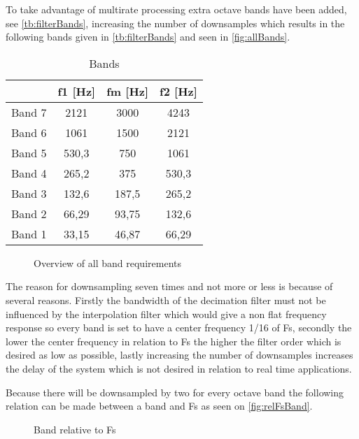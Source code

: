 To take advantage of multirate processing extra octave bands have been added, see \autoref{tb:filterBands}, increasing the number of downsamples which results in the following bands given in \autoref{tb:filterBands} and seen in \autoref{fig:allBands}.
\begin{table}[H]
\centering
\begin{tabular}{|c|c|c|c|}
\hline
       & f1 {[}Hz{]} & fm {[}Hz{]} & f2 {[}Hz{]} \\ \hline
Band 7 & 2121        & 3000        & 4243        \\ \hline
Band 6 & 1061        & 1500        & 2121        \\ \hline
Band 5 & 530,3       & 750         & 1061        \\ \hline
Band 4 & 265,2       & 375         & 530,3       \\ \hline
Band 3 & 132,6       & 187,5       & 265,2       \\ \hline
Band 2 & 66,29       & 93,75       & 132,6       \\ \hline
Band 1 & 33,15       & 46,87       & 66,29       \\ \hline
\end{tabular}
\caption{Bands}
\label{tb:filterBands}
\end{table}   

\begin{figure}[H]
	\centering
	
	\caption{Overview of all band requirements}
	\label{fig:allBands}
\end{figure}
The reason for downsampling seven times and not more or less is because of several reasons. Firstly the bandwidth of the decimation filter must not be influenced by the interpolation filter which would give a non flat frequency response so every band is set to have a center frequency 1/16 of Fs, secondly the lower the center frequency in relation to Fs the higher the filter order which is desired as low as possible, lastly increasing the number of downsamples increases the delay of the system which is not desired in relation to real time applications.       

Because there will be downsampled by two for every octave band the following relation can be made between a band and Fs as seen on \autoref{fig:relFsBand}.
\begin{figure}[H]
	\centering
	
	\caption{Band relative to Fs}
	\label{fig:relFsBand}
\end{figure}

